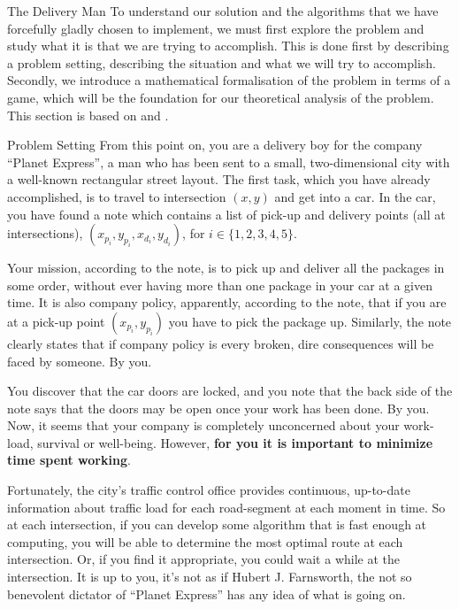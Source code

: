 \begin{section}{The Delivery Man}
  To understand our solution and the algorithms that we have forcefully gladly chosen to implement, we must first explore the problem and study what it is that we are trying to accomplish. This is done first by describing a problem setting, describing the situation and what we will try to accomplish. Secondly, we introduce a mathematical formalisation of the problem in terms of a game, which will be the foundation for our theoretical analysis of the problem. This section is based on \cite{run} and \cite{lab}.
  
  \begin{subsection}{Problem Setting}
    From this point on, you are a delivery boy for the company ``Planet Express'', a man who has been sent to a small, two-dimensional city with a well-known rectangular street layout. The first task, which you have already accomplished, is to travel to intersection $(x, y)$ and get into a car. In the car, you have found a note which contains a list of pick-up and delivery points (all at intersections), $(x_{p_i}, y_{p_i}, x_{d_i}, y_{d_i})$, for $i\in \{1,2,3,4, 5\}$. 

    Your mission, according to the note, is to pick up and deliver all the packages in some order, without ever having more than one package in your car at a given time. It is also company policy, apparently, according to the note, that if you are at a pick-up point $(x_{p_i}, y_{p_i})$ you have to pick the package up. Similarly, the note clearly states that if company policy is every broken, dire consequences will be faced by someone. By you.
    
    You discover that the car doors are locked, and you note that the back side of the note says that the doors may be open once your work has been done. By you. Now, it seems that your company is completely unconcerned about your work-load, survival or well-being. However, \textbf{for you it is important to minimize time spent working}.

    Fortunately, the city's traffic control office provides continuous, up-to-date information about traffic load for each road-segment at each moment in time. So at each intersection, if you can develop some algorithm that is fast enough at computing, you will be able to determine the most optimal route at each intersection. Or, if you find it appropriate, you could wait a while at the intersection. It is up to you, it's not as if Hubert J. Farnsworth, the not so benevolent dictator of ``Planet Express'' has any idea of what is going on.
  \end{subsection}


\end{section}
